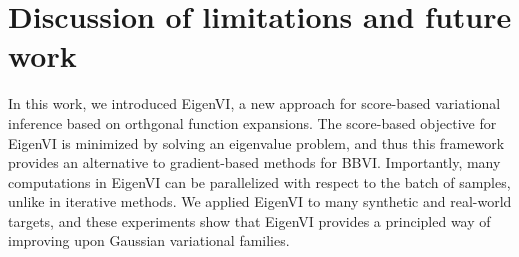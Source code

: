 
%

\section{Discussion of limitations and future work}
\label{sec:conclusion}

In this work, we introduced EigenVI, a new approach for score-based variational inference based on orthgonal function expansions.
%
The score-based objective for EigenVI is minimized by solving an eigenvalue problem, and thus this framework provides an alternative to gradient-based methods for BBVI.
Importantly, many computations in EigenVI can be parallelized with respect to the batch of samples,
unlike in iterative methods. We applied EigenVI to many synthetic and real-world targets, and these experiments show that EigenVI provides
a principled way of improving upon Gaussian variational families.

